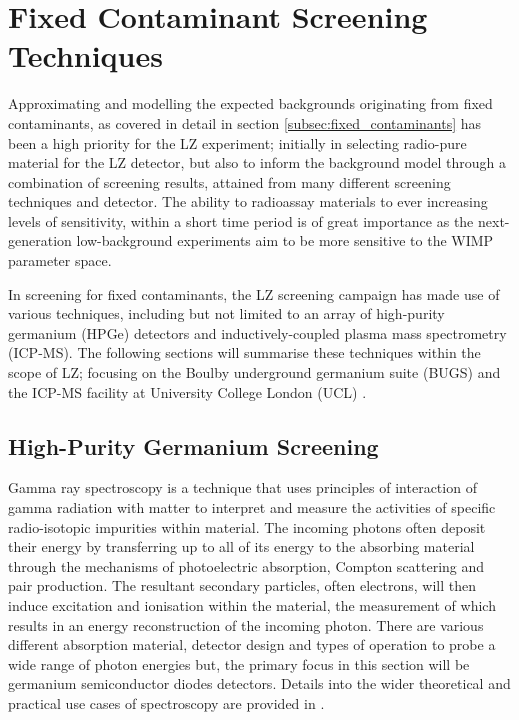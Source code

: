 \section{Fixed Contaminant Screening Techniques}
\label{sec:fixed_contaminant_screening}

Approximating and modelling the expected backgrounds originating from fixed contaminants, as covered in detail in section \ref{subsec:fixed_contaminants} has been a high priority for the LZ experiment; initially in selecting radio-pure material for the LZ detector, but also to inform the background model through a combination of screening results, attained from many different screening techniques and detector. The ability to radioassay materials to ever increasing levels of sensitivity, within a short time period is of great importance as the next-generation low-background experiments aim to be more sensitive to the WIMP parameter space. 

In screening for fixed contaminants, the LZ screening campaign has made use of various techniques, including but not limited to an array of high-purity germanium (HPGe) detectors and inductively-coupled plasma mass spectrometry (ICP-MS). The following sections will summarise these techniques within the scope of LZ; focusing on the Boulby underground germanium suite (BUGS) \cite{bugs_boulby} and the ICP-MS facility at University College London (UCL) \cite{icpms_ucl}. 


\subsection{High-Purity Germanium Screening}
\label{subsec:HPGe}

Gamma ray spectroscopy is a technique that uses principles of interaction of gamma radiation with matter to interpret and measure the activities of specific radio-isotopic impurities within material. The incoming \gray{} photons often deposit their energy by transferring up to all of its energy to the absorbing material through the mechanisms of photoelectric absorption, Compton scattering and pair production. The resultant secondary particles, often electrons, will then induce excitation and ionisation within the material, the measurement of which results in an energy reconstruction of the incoming photon. There are various different absorption material, detector design and types of operation to probe a wide range of photon energies but, the primary focus in this section will be germanium semiconductor diodes detectors. Details into the wider theoretical and practical use cases of \gray{} spectroscopy are provided in \cite{gilmore2011practical}.

